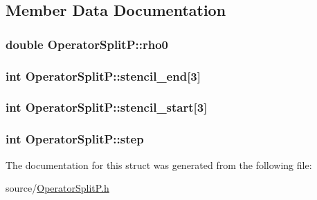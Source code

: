 \subsection{Member Data Documentation}
\hypertarget{struct_operator_split_p_a3ac24a890985abf7a9aacbd5dd6eb793}{}
\subsubsection[{rho0}]{\setlength{\rightskip}{0pt plus 5cm}double Operator\+Split\+P\+::rho0}\label{struct_operator_split_p_a3ac24a890985abf7a9aacbd5dd6eb793}
\hypertarget{struct_operator_split_p_a95a4b7a553633934a6fd9b293f340163}{}
\subsubsection[{stencil\+\_\+end}]{\setlength{\rightskip}{0pt plus 5cm}int Operator\+Split\+P\+::stencil\+\_\+end\mbox{[}3\mbox{]}}\label{struct_operator_split_p_a95a4b7a553633934a6fd9b293f340163}
\hypertarget{struct_operator_split_p_aefdeb53904b6203f60aaf16f0f86c5c7}{}
\subsubsection[{stencil\+\_\+start}]{\setlength{\rightskip}{0pt plus 5cm}int Operator\+Split\+P\+::stencil\+\_\+start\mbox{[}3\mbox{]}}\label{struct_operator_split_p_aefdeb53904b6203f60aaf16f0f86c5c7}
\hypertarget{struct_operator_split_p_a0ecf20a65e1c44eb54de490c9db4e177}{}
\subsubsection[{step}]{\setlength{\rightskip}{0pt plus 5cm}int Operator\+Split\+P\+::step}\label{struct_operator_split_p_a0ecf20a65e1c44eb54de490c9db4e177}


The documentation for this struct was generated from the following file\+:\begin{DoxyCompactItemize}
\item 
source/\hyperlink{_operator_split_p_8h}{Operator\+Split\+P.\+h}\end{DoxyCompactItemize}

